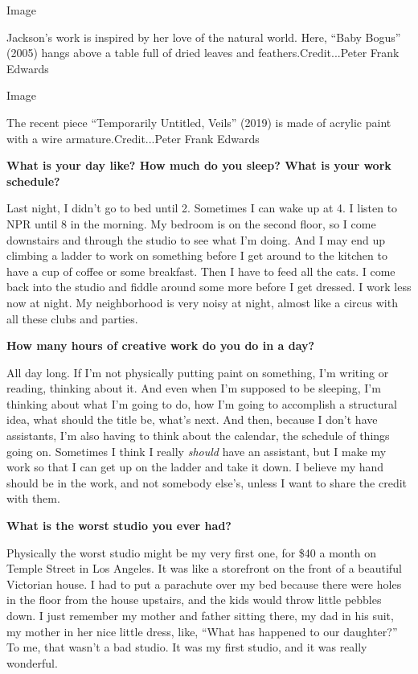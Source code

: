 Image

Jackson's work is inspired by her love of the natural world. Here,
``Baby Bogus'' (2005) hangs above a table full of dried leaves and
feathers.Credit...Peter Frank Edwards

Image

The recent piece ``Temporarily Untitled, Veils'' (2019) is made of
acrylic paint with a wire armature.Credit...Peter Frank Edwards

\textbf{What is your day like? How much do you sleep? What is your work
schedule?}

Last night, I didn't go to bed until 2. Sometimes I can wake up at 4. I
listen to NPR until 8 in the morning. My bedroom is on the second floor,
so I come downstairs and through the studio to see what I'm doing. And I
may end up climbing a ladder to work on something before I get around to
the kitchen to have a cup of coffee or some breakfast. Then I have to
feed all the cats. I come back into the studio and fiddle around some
more before I get dressed. I work less now at night. My neighborhood is
very noisy at night, almost like a circus with all these clubs and
parties.

\textbf{How many hours of creative work do you do in a day?}

All day long. If I'm not physically putting paint on something, I'm
writing or reading, thinking about it. And even when I'm supposed to be
sleeping, I'm thinking about what I'm going to do, how I'm going to
accomplish a structural idea, what should the title be, what's next. And
then, because I don't have assistants, I'm also having to think about
the calendar, the schedule of things going on. Sometimes I think I
really \emph{should} have an assistant, but I make my work so that I can
get up on the ladder and take it down. I believe my hand should be in
the work, and not somebody else's, unless I want to share the credit
with them.

\textbf{What is the worst studio you ever had?}

Physically the worst studio might be my very first one, for \$40 a month
on Temple Street in Los Angeles. It was like a storefront on the front
of a beautiful Victorian house. I had to put a parachute over my bed
because there were holes in the floor from the house upstairs, and the
kids would throw little pebbles down. I just remember my mother and
father sitting there, my dad in his suit, my mother in her nice little
dress, like, ``What has happened to our daughter?'' To me, that wasn't a
bad studio. It was my first studio, and it was really wonderful.

